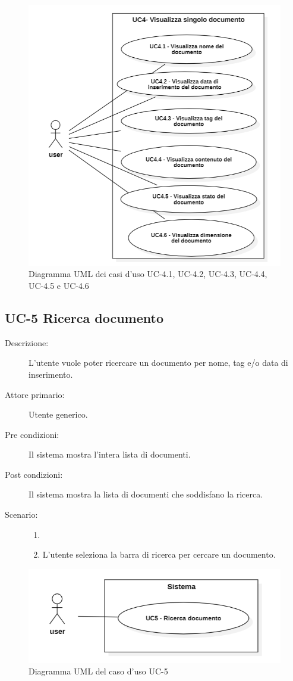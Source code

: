 \begin{figure}[H]
    \centering
    \includegraphics[width=0.8\linewidth]{UC4.1.PNG}
    \caption{Diagramma UML dei casi d'uso UC-4.1, UC-4.2, UC-4.3, UC-4.4, UC-4.5 e UC-4.6} 
\end{figure}

\subsection{UC-5 Ricerca documento}
\begin{description}
    \item[Descrizione:] L’utente vuole poter ricercare un documento per nome, tag e/o data di inserimento.
    \item[Attore primario:] Utente generico.
    \item[Pre condizioni:] Il sistema mostra l’intera lista di documenti.
    \item[Post condizioni:] Il sistema mostra la lista di documenti che soddisfano la ricerca.
    \item[Scenario:]
    \begin{enumerate}
        \item[]
        \item L’utente seleziona la barra di ricerca per cercare un documento.
    \end{enumerate}
\end{description}

\begin{figure}[H]
    \centering
    \includegraphics[width=0.8\linewidth]{UC5.PNG} %
    \caption{Diagramma UML del caso d'uso UC-5}
    \label{fig:UC5}
\end{figure}

